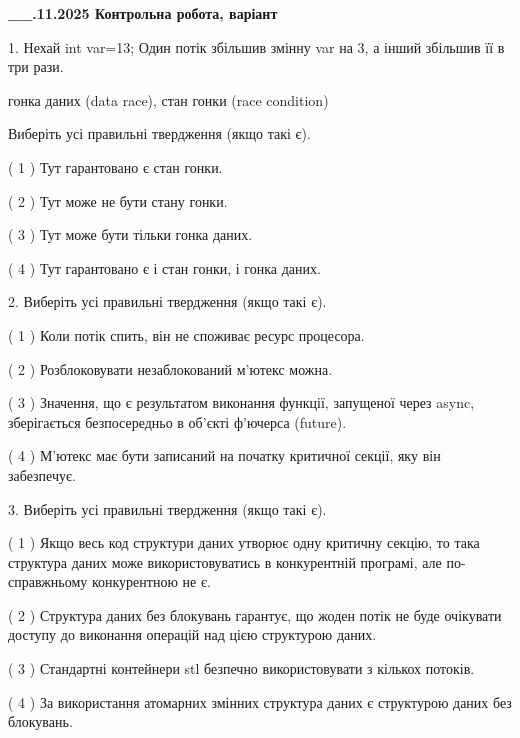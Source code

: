 \documentclass[12pt, ukrainian]{article}
\begin{document}
\newpage
\begin {large}

\textbf{\_\_.11.2025 Контрольна робота, варіант  }\par


{
1. Нехай int var=13; Один потік збільшив змінну var на 3, а інший збільшив її в три рази.

гонка даних (data race), стан гонки (race condition)

Виберіть усі правильні твердження (якщо такі є).\par
\vspace{2mm}
( 1 ) Тут гарантовано є стан гонки.%

( 2 ) Тут може не бути стану гонки.%

( 3 ) Тут може бути тільки гонка даних.%

( 4 ) Тут гарантовано є і стан гонки, і гонка даних.%


2. Виберіть усі правильні твердження (якщо такі є).\par
\vspace{2mm}

( 1 ) Коли потік спить, він не споживає ресурс процесора.%

( 2 ) Розблоковувати незаблокований м’ютекс можна.%

( 3 ) Значення, що є результатом виконання функції, запущеної через async, зберігається безпосередньо в об’єкті ф’ючерса (future).%

( 4 ) М’ютекс має бути записаний на початку критичної секції, яку він забезпечує.%


3. Виберіть усі правильні твердження (якщо такі є).\par
\vspace{2mm}

( 1 ) Якщо весь код структури даних утворює одну критичну секцію, то така структура даних може використовуватись в конкурентній програмі, але по-справжньо\-му конкурентною не є.%

( 2 ) Структура даних без блокувань гарантує, що жоден потік не буде очікувати доступу до виконання операцій над цією структурою даних.%

( 3 ) Стандартні контейнери stl безпечно використовувати з кількох потоків.%

( 4 ) За використання атомарних змінних структура даних є структурою даних без блокувань.%


}
\end{large}
\end{document}
